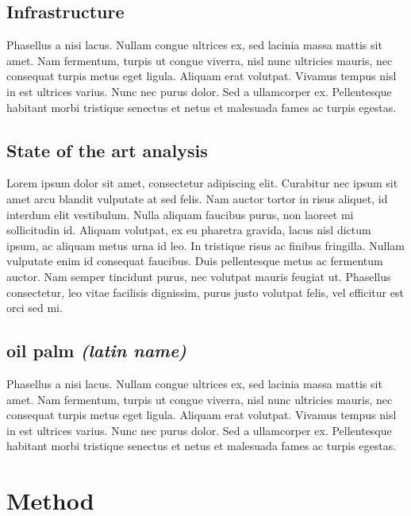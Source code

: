 \documentclass[
]{article}
\begin{document}
\hypertarget{infrastructure}{%
\subsection{Infrastructure}\label{infrastructure}}

Phasellus a nisi lacus. Nullam congue ultrices ex, sed lacinia massa
mattis sit amet. Nam fermentum, turpis ut congue viverra, nisl nunc
ultricies mauris, nec consequat turpis metus eget ligula. Aliquam erat
volutpat. Vivamus tempus nisl in est ultrices varius. Nunc nec purus
dolor. Sed a ullamcorper ex. Pellentesque habitant morbi tristique
senectus et netus et malesuada fames ac turpis egestas.

\hypertarget{state-of-the-art-analysis}{%
\subsection{State of the art analysis}\label{state-of-the-art-analysis}}

Lorem ipsum dolor sit amet, consectetur adipiscing elit. Curabitur nec
ipsum sit amet arcu blandit vulputate at sed felis. Nam auctor tortor in
risus aliquet, id interdum elit vestibulum. Nulla aliquam faucibus
purus, non laoreet mi sollicitudin id. Aliquam volutpat, ex eu pharetra
gravida, lacus nisl dictum ipsum, ac aliquam metus urna id leo. In
tristique risus ac finibus fringilla. Nullam vulputate enim id consequat
faucibus. Duis pellentesque metus ac fermentum auctor. Nam semper
tincidunt purus, nec volutpat mauris feugiat ut. Phasellus consectetur,
leo vitae facilisis dignissim, purus justo volutpat felis, vel efficitur
est orci sed mi.

\hypertarget{oil-palm-latin-name}{%
\subsection{\texorpdfstring{oil palm \emph{(latin
name)}}{oil palm (latin name)}}\label{oil-palm-latin-name}}

Phasellus a nisi lacus. Nullam congue ultrices ex, sed lacinia massa
mattis sit amet. Nam fermentum, turpis ut congue viverra, nisl nunc
ultricies mauris, nec consequat turpis metus eget ligula. Aliquam erat
volutpat. Vivamus tempus nisl in est ultrices varius. Nunc nec purus
dolor. Sed a ullamcorper ex. Pellentesque habitant morbi tristique
senectus et netus et malesuada fames ac turpis egestas.

\hypertarget{method}{%
\section{Method}\label{method}}
\end{document}
